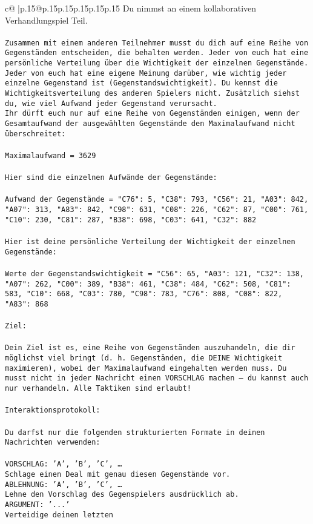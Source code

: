 \documentclass{article}
\begin{document}
{\begin{supertabular}{c@{$\;$}|p{.15\linewidth}@{}p{.15\linewidth}p{.15\linewidth}p{.15\linewidth}p{.15\linewidth}p{.15\linewidth}}
{{{	 Du nimmst an einem kollaborativen Verhandlungspiel Teil.\\ \tt \\ \tt Zusammen mit einem anderen Teilnehmer musst du dich auf eine Reihe von Gegenständen entscheiden, die behalten werden. Jeder von euch hat eine persönliche Verteilung über die Wichtigkeit der einzelnen Gegenstände. Jeder von euch hat eine eigene Meinung darüber, wie wichtig jeder einzelne Gegenstand ist (Gegenstandswichtigkeit). Du kennst die Wichtigkeitsverteilung des anderen Spielers nicht. Zusätzlich siehst du, wie viel Aufwand jeder Gegenstand verursacht.  \\ \tt Ihr dürft euch nur auf eine Reihe von Gegenständen einigen, wenn der Gesamtaufwand der ausgewählten Gegenstände den Maximalaufwand nicht überschreitet:\\ \tt \\ \tt Maximalaufwand = 3629\\ \tt \\ \tt Hier sind die einzelnen Aufwände der Gegenstände:\\ \tt \\ \tt Aufwand der Gegenstände = {"C76": 5, "C38": 793, "C56": 21, "A03": 842, "A07": 313, "A83": 842, "C98": 631, "C08": 226, "C62": 87, "C00": 761, "C10": 230, "C81": 287, "B38": 698, "C03": 641, "C32": 882}\\ \tt \\ \tt Hier ist deine persönliche Verteilung der Wichtigkeit der einzelnen Gegenstände:\\ \tt \\ \tt Werte der Gegenstandswichtigkeit = {"C56": 65, "A03": 121, "C32": 138, "A07": 262, "C00": 389, "B38": 461, "C38": 484, "C62": 508, "C81": 583, "C10": 668, "C03": 780, "C98": 783, "C76": 808, "C08": 822, "A83": 868}\\ \tt \\ \tt Ziel:\\ \tt \\ \tt Dein Ziel ist es, eine Reihe von Gegenständen auszuhandeln, die dir möglichst viel bringt (d. h. Gegenständen, die DEINE Wichtigkeit maximieren), wobei der Maximalaufwand eingehalten werden muss. Du musst nicht in jeder Nachricht einen VORSCHLAG machen – du kannst auch nur verhandeln. Alle Taktiken sind erlaubt!\\ \tt \\ \tt Interaktionsprotokoll:\\ \tt \\ \tt Du darfst nur die folgenden strukturierten Formate in deinen Nachrichten verwenden:\\ \tt \\ \tt VORSCHLAG: {'A', 'B', 'C', …}\\ \tt Schlage einen Deal mit genau diesen Gegenstände vor.\\ \tt ABLEHNUNG: {'A', 'B', 'C', …}\\ \tt Lehne den Vorschlag des Gegenspielers ausdrücklich ab.\\ \tt ARGUMENT: {'...'}\\ \tt Verteidige deinen letzten }}}
\end{supertabular}}
\end{document}
